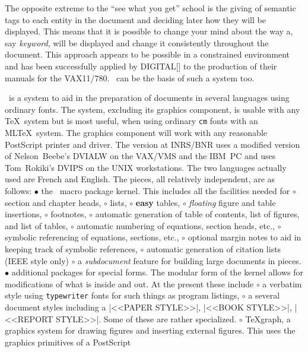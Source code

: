 The opposite extreme to the ``see what you get'' school is the giving of
semantic tags to each entity in the document and deciding later how they will
be displayed. This means that it is possible to change your mind about the
way a, say {\it keyword}, will be displayed and change it consistently
throughout the document. This approach appears to be possible in a
constrained environment and has been successfully applied by
DIGITAL[\cite{[Digi83]}] to the production of their manuals for the VAX11/780.
\tex\ can be the basis of such a system too.

\intex\ is 
a system to aid in the preparation of documents in several languages using
ordinary fonts. The system, excluding its graphics component, is usable
with any \TeX\ system but is most useful, when using ordinary {\tt cm}
fonts with an ML\TeX\ system. The graphics component will work with any
reasonable PostScript printer and driver. The version at INRS/BNR uses a
modified version of Nelson~Beebe's DVIALW on the VAX/VMS and the IBM~PC and
uses Tom~Rokiki's DVIPS on the UNIX workstations. 
The two languages actually used are French and English. The
pieces, all relatively independent, are as follows:
\beginlist
\li $\bullet$ the \intex\ macro package kernel. This includes all the
facilities needed for 
\beginsublist
\tightenlist 
\li $\circ$ section and chapter heads,
\li $\circ$ lists,
\li $\circ$ {\bf easy} tables,
\li $\circ$ {\it floating} figure and table insertions, 
\li $\circ$ footnotes,
\li $\circ$ automatic generation of table of contents, list of figures, and
list of tables, 
\li $\circ$ automatic numbering of equations, section heads, etc.,
\li $\circ$ symbolic referencing of equations, sections, etc.,
\li $\circ$ optional margin notes to aid in keeping track of symbolic
references, 
\li $\circ$ automatic generation of citation lists (IEEE style only)
\li $\circ$ a {\it subdocument} feature for building large documents in
pieces.
\endsublist
\li $\bullet$ additional packages for special forms. The modular form of the
kernel allows for modifications of what is inside and out. At the present
these include 
\beginsublist
\li $\circ$ a verbatim style using {\tt typewriter} fonts for such things as
program listings,
\li $\circ$ a several document styles including a |<<PAPER STYLE>>|, 
|<<BOOK STYLE>>|, |<<REPORT STYLE>>|. Some of these are rather specialized.
\li $\circ$ \TeX graph, a graphics system for drawing figures and inserting
external figures. This uses the graphics primitives of  a PostScript
